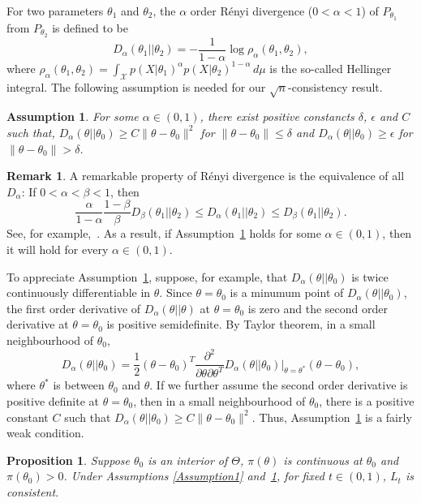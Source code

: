 \documentclass[11pt]{article}
\theoremstyle{plain}
\newtheorem{proposition}{\quad\quad Proposition}
\newtheorem{assumption}{\quad\quad Assumption}
\theoremstyle{definition}
\newtheorem{remark}{\quad\quad Remark}
\theoremstyle{remark}
\begin{document}
 For two parameters $\theta_1$ and $\theta_2$, the $\alpha$ order R\'{e}nyi divergence ($0<\alpha<1$) of $P_{\theta_1}$ from $P_{\theta_2}$ is defined to be
$$
D_{\alpha}(\theta_1||\theta_2)=-\frac{1}{1-\alpha}\log \rho_{\alpha}(\theta_1,\theta_2),
$$
where
$
\rho_{\alpha}(\theta_1,\theta_2)=\int_{\mathcal{X}} p(X|\theta_1)^{\alpha} p(X|\theta_2)^{1-\alpha} \, d \mu
$ is the so-called Hellinger integral.
The following assumption is needed for our $\sqrt{n}$-consistency result.
\begin{assumption}\label{Assumption4}
    For some $\alpha\in(0,1)$, there exist positive constancts $\delta$, $\epsilon$ and $C$ such that,
     $D_{\alpha}(\theta||\theta_0)  \geq  C \|\theta-\theta_0\|^2$ for $\|\theta-\theta_0\|\leq \delta$ and $D_{\alpha}(\theta||\theta_0) \geq \epsilon$ for $\|\theta-\theta_0\|>\delta$.
\end{assumption}
\begin{remark}
    A remarkable property of R\'{e}nyi divergence is the equivalence of all $D_{\alpha}$: If $0<\alpha<\beta<1$, then
    $$
    \frac{\alpha}{1-\alpha}\frac{1-\beta}{\beta} D_{\beta}(\theta_1||\theta_2)
    \leq D_{\alpha}(\theta_1||\theta_2)\leq D_{\beta}(\theta_1||\theta_2).
    $$
    See, for example,~\cite{2016arXiv160801805B}.
    As a result, if Assumption~\ref{Assumption4} holds for some $\alpha\in(0,1)$, then it will hold for every $\alpha\in(0,1)$.
\end{remark}
To appreciate Assumption~\ref{Assumption4},
   suppose, for example, that $D_{\alpha}(\theta||\theta_0)$ is twice continuously differentiable in $\theta$.
   Since $\theta=\theta_0$ is a minumum point of  $D_{\alpha}(\theta||\theta_0)$, the first order derivative of $D_{\alpha}(\theta||\theta)$ at $\theta=\theta_0$ is zero and the second order derivative at $\theta=\theta_0$ is positive semidefinite.
By Taylor theorem, in a small neighbourhood of $\theta_0$,
   $$
   D_{\alpha}(\theta||\theta_0)=\frac{1}{2}(\theta-\theta_0)^T \frac{\partial^2}{\partial \theta \partial \theta^T} D_{\alpha}(\theta||\theta_0)\Big|_{\theta=\theta^*}  (\theta-\theta_0),
   $$
   where $\theta^*$ is between $\theta_0$ and $\theta$.
   If we further assume the second order derivative is positive definite at $\theta=\theta_0$, then in a small neighbourhood of $\theta_0$, there is a positive constant $C$ such that $D_{\alpha}(\theta||\theta_0)\geq C\|\theta-\theta_0\|^2$.
   Thus, Assumption~\ref{Assumption4} is a fairly weak condition.
\begin{proposition}\label{Theoremless1}
    Suppose $\theta_0$ is an interior of $\Theta$, $\pi(\theta)$ is continuous at $\theta_0$ and $\pi(\theta_0)>0$.
    Under Assumptions \ref{Assumption1} and~\ref{Assumption4}, for fixed $t\in(0,1)$, $L_t$ is consistent.
\end{proposition}
\end{document}
